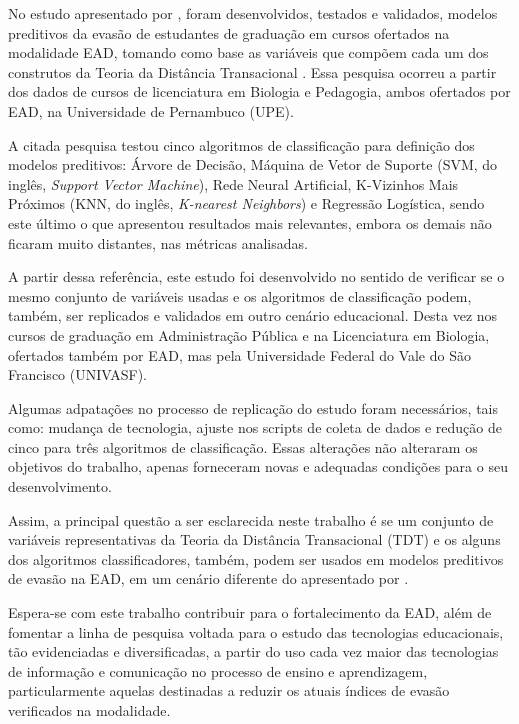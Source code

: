 No estudo apresentado por , foram desenvolvidos,
testados e validados, modelos preditivos da evasão de estudantes de graduação em
cursos ofertados na modalidade EAD, tomando como base as variáveis que compõem
cada um dos construtos da Teoria da Distância Transacional
\cite{moore2008teoria}. Essa pesquisa ocorreu a partir dos dados de cursos de
licenciatura em Biologia e Pedagogia, ambos ofertados por EAD, na Universidade
de Pernambuco (UPE).

A citada pesquisa testou cinco algoritmos de classificação para definição dos
modelos preditivos: Árvore de Decisão, Máquina de Vetor de Suporte (SVM, do inglês, \textit{Support Vector Machine}), Rede
Neural Artificial, K-Vizinhos Mais Próximos (KNN, do inglês, \textit{K-nearest
Neighbors}) e Regressão Logística, sendo este último o que apresentou resultados
mais relevantes, embora os demais não ficaram muito distantes, nas métricas
analisadas.

A partir dessa referência, este estudo foi desenvolvido no sentido de verificar
se o mesmo conjunto de variáveis usadas e os algoritmos de classificação podem,
também, ser replicados e validados em outro cenário educacional. Desta vez nos
cursos de graduação em Administração Pública e na Licenciatura em Biologia,
ofertados também por EAD, mas pela Universidade Federal do Vale do São Francisco
(UNIVASF).

Algumas adpatações no processo de replicação do estudo foram necessários, tais
como: mudança de tecnologia, ajuste nos scripts de coleta de dados e redução de
cinco para três algoritmos de classificação. Essas alterações não alteraram os
objetivos do trabalho, apenas forneceram novas e adequadas condições para o seu
desenvolvimento.

Assim, a principal questão a ser esclarecida neste trabalho é se um conjunto de
variáveis representativas da Teoria da Distância Transacional (TDT) e os alguns
dos algoritmos classificadores, também, podem ser usados em modelos preditivos
de evasão na EAD, em um cenário diferente do apresentado por
.

Espera-se com este trabalho contribuir para o fortalecimento da EAD, além de
fomentar a linha de pesquisa voltada para o estudo das tecnologias educacionais,
tão evidenciadas e diversificadas, a partir do uso cada vez maior das
tecnologias de informação e comunicação no processo de ensino e aprendizagem,
particularmente aquelas destinadas a reduzir os atuais índices de evasão
verificados na modalidade.

